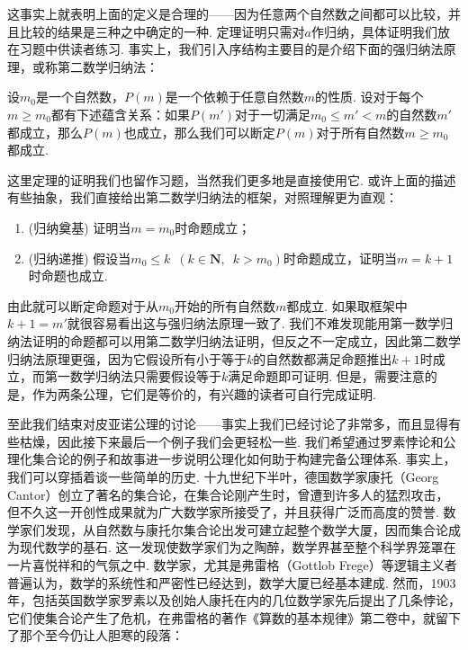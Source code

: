 这事实上就表明上面的定义是合理的——因为任意两个自然数之间都可以比较，并且比较的结果是三种之中确定的一种. 定理证明只需对$a$作归纳，具体证明我们放在习题中供读者练习. 事实上，我们引入序结构主要目的是介绍下面的强归纳法原理，或称第二数学归纳法：

\begin{theorem}%
    \label{thm:1e:强归纳法原理} 
    设$m_0$是一个自然数，$P(m)$是一个依赖于任意自然数$m$的性质. 设对于每个$m\geqslant m_0$都有下述蕴含关系：如果$P(m')$对于一切满足$m_0\leqslant m'<m$的自然数$m'$都成立，那么$P(m)$也成立，那么我们可以断定$P(m)$对于所有自然数$m\geqslant m_0$都成立.
\end{theorem}

这里定理的证明我们也留作习题，当然我们更多地是直接使用它. 或许上面的描述有些抽象，我们直接给出第二数学归纳法的框架，对照理解更为直观：
\begin{enumerate}
    \item (归纳奠基) 证明当$m=m_0$时命题成立；

    \item (归纳递推) 假设当$m_0\leqslant k\enspace(k\in\mathbf{N},\enspace k>m_0)$时命题成立，证明当$m=k+1$时命题也成立.
\end{enumerate}
由此就可以断定命题对于从$m_0$开始的所有自然数$m$都成立. 如果取框架中$k+1=m'$就很容易看出这与强归纳法原理一致了. 我们不难发现能用第一数学归纳法证明的命题都可以用第二数学归纳法证明，但反之不一定成立，因此第二数学归纳法原理更强，因为它假设所有小于等于$k$的自然数都满足命题推出$k+1$时成立，而第一数学归纳法只需要假设等于$k$满足命题即可证明. 但是，需要注意的是，作为两条公理，它们是等价的，有兴趣的读者可自行完成证明.

至此我们结束对皮亚诺公理的讨论——事实上我们已经讨论了非常多，而且显得有些枯燥，因此接下来最后一个例子我们会更轻松一些. 我们希望通过罗素悖论和公理化集合论的例子和故事进一步说明公理化如何助于构建完备公理体系. 事实上，我们可以穿插着谈一些简单的历史. 十九世纪下半叶，德国数学家康托（Georg Cantor）创立了著名的集合论，在集合论刚产生时，曾遭到许多人的猛烈攻击，但不久这一开创性成果就为广大数学家所接受了，并且获得广泛而高度的赞誉. 数学家们发现，从自然数与康托尔集合论出发可建立起整个数学大厦，因而集合论成为现代数学的基石. 这一发现使数学家们为之陶醉，数学界甚至整个科学界笼罩在一片喜悦祥和的气氛之中. 数学家，尤其是弗雷格（Gottlob Frege）等逻辑主义者普遍认为，数学的系统性和严密性已经达到，数学大厦已经基本建成. 然而，1903年，包括英国数学家罗素以及创始人康托在内的几位数学家先后提出了几条悖论，它们使集合论产生了危机，在弗雷格的著作《算数的基本规律》第二卷中，就留下了那个至今仍让人胆寒的段落：

